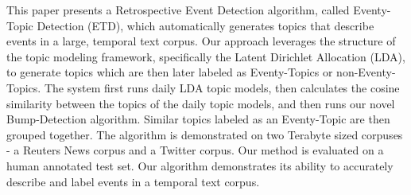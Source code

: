 This paper presents a Retrospective Event Detection algorithm, called Eventy-Topic Detection (ETD), which automatically generates topics that describe events in a large, temporal text corpus.  Our approach leverages the structure of the topic modeling framework, specifically the Latent Dirichlet Allocation (LDA), to generate topics which are then later labeled as Eventy-Topics or non-Eventy-Topics.  The system first runs daily LDA topic models, then calculates the cosine similarity between the topics of the daily topic models, and then runs our novel Bump-Detection algorithm.  Similar topics labeled as an Eventy-Topic are then grouped together.  The algorithm is demonstrated on two Terabyte sized corpuses - a Reuters News corpus and a Twitter corpus.  Our method is evaluated on a human annotated test set.  Our algorithm demonstrates its ability to accurately describe and label events in a temporal text corpus.
